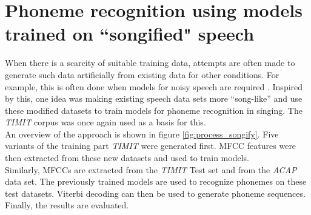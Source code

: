 

\section{Phoneme recognition using models trained on ``songified" speech}

When there is a scarcity of suitable training data, attempts are often made to generate such data artificially from existing data for other conditions. For example, this is often done when models for noisy speech are required \cite{ntimit}\cite{aurora}. Inspired by this, one idea was making existing speech data sets more ``song-like'' and use these modified datasets to train models for phoneme recognition in singing. The \textit{TIMIT} corpus was once again used as a basis for this.\\

An overview of the approach is shown in figure \ref{fig:process_songify}. Five variants of the training part  \textit{TIMIT} were generated first. MFCC features were then extracted from these new datasets and used to train models.\\
Similarly, MFCCs are extracted from the \textit{TIMIT} Test set and from the \textit{ACAP} data set. The previously trained models are used to recognize phonemes on these test datasets. Viterbi decoding can then be used to generate phoneme sequences. Finally, the results are evaluated.

